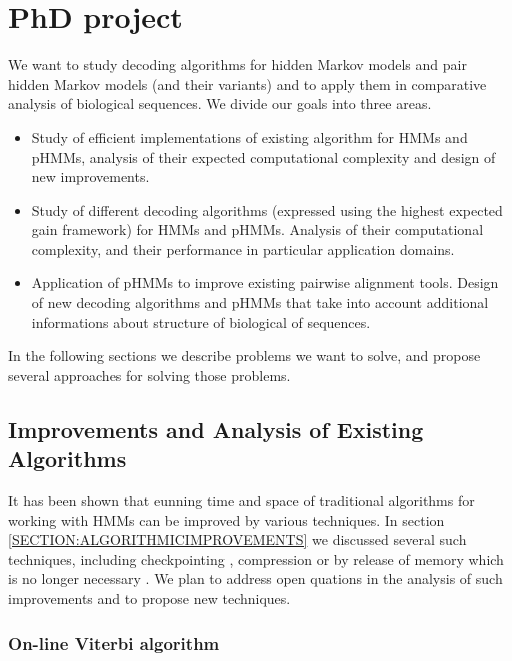 \chapter{PhD project}

We want to study decoding algorithms for hidden Markov models and pair hidden
Markov models (and their variants) and to apply them in comparative analysis
of biological sequences. We divide our goals into three areas.
\begin{itemize}
\item Study of efficient implementations of existing algorithm for HMMs and
pHMMs, analysis of their expected computational complexity and design of  new
improvements.

\item Study of different decoding algorithms (expressed using the highest
expected gain framework) for HMMs and pHMMs. Analysis of their computational
complexity, and their performance in particular application domains.    

\item Application of pHMMs to improve existing pairwise alignment
tools. Design of new decoding algorithms and pHMMs that take into
account additional informations about structure of biological of sequences.
\end{itemize}
In the following sections we describe problems we want to solve, and propose several
approaches for solving those problems.


\section{Improvements and Analysis of Existing Algorithms}

It has been shown that eunning time and space of traditional algorithms for working with HMMs can be
improved by various techniques. In section \ref{SECTION:ALGORITHMICIMPROVEMENTS}
we discussed several such techniques, including checkpointing
\cite{Grice1997}, compression \cite{Lifshits2009} or by release of memory which
is no longer necessary \cite{Sramek2007}. We plan to address open quations in
the analysis of such improvements and to propose new techniques.

\subsection{On-line Viterbi algorithm}

